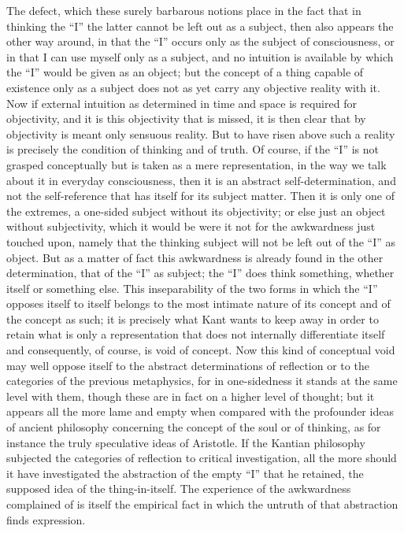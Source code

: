 The defect, which these surely barbarous notions place
in the fact that in thinking the “I”
the latter cannot be left out as a subject,
then also appears the other way around,
in that the “I” occurs only as the subject of consciousness,
or in that I can use myself only as a subject,
and no intuition is available by which the “I” would be given as an object;
but the concept of a thing capable of existence only as a subject
does not as yet carry any objective reality with it.
Now if external intuition as determined in
time and space is required for objectivity,
and it is this objectivity that is missed,
it is then clear that by objectivity is meant only sensuous reality.
But to have risen above such a reality is precisely
the condition of thinking and of truth.
Of course, if the “I” is not grasped conceptually
but is taken as a mere representation,
in the way we talk about it in everyday consciousness,
then it is an abstract self-determination,
and not the self-reference that has itself
for its subject matter.
Then it is only one of the extremes,
a one-sided subject without its objectivity;
or else just an object without subjectivity,
which it would be were it not for the awkwardness just touched upon,
namely that the thinking subject will not
be left out of the “I” as object.
But as a matter of fact this awkwardness is
already found in the other determination,
that of the “I” as subject;
the “I” does think something,
whether itself or something else.
This inseparability of the two forms
in which the “I” opposes itself to itself
belongs to the most intimate nature of its concept
and of the concept as such;
it is precisely what Kant wants to keep away
in order to retain what is only a representation
that does not internally differentiate itself
and consequently, of course, is void of concept.
Now this kind of conceptual void may well oppose itself
to the abstract determinations of reflection
or to the categories of the previous metaphysics,
for in one-sidedness it stands at the same level with them,
though these are in fact on a higher level of thought;
but it appears all the more lame and empty
when compared with the profounder ideas
of ancient philosophy concerning
the concept of the soul or of thinking,
as for instance the truly speculative ideas of Aristotle.
If the Kantian philosophy subjected the
categories of reflection to critical investigation,
all the more should it have investigated the abstraction
of the empty “I” that he retained,
the supposed idea of the thing-in-itself.
The experience of the awkwardness complained of is
itself the empirical fact in which
the untruth of that abstraction finds expression.

